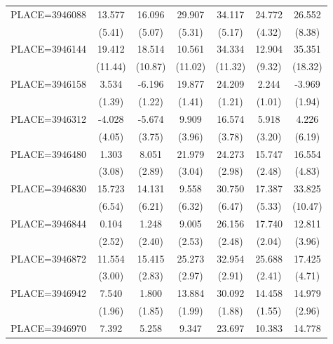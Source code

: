 {\begin{tabular}{l*{6}{c}}
PLACE=3946088       &      13.577&      16.096&      29.907&      34.117&      24.772&      26.552\\
                    &      (5.41)&      (5.07)&      (5.31)&      (5.17)&      (4.32)&      (8.38)\\
PLACE=3946144       &      19.412&      18.514&      10.561&      34.334&      12.904&      35.351\\
                    &     (11.44)&     (10.87)&     (11.02)&     (11.32)&      (9.32)&     (18.32)\\
PLACE=3946158       &       3.534&      -6.196&      19.877&      24.209&       2.244&      -3.969\\
                    &      (1.39)&      (1.22)&      (1.41)&      (1.21)&      (1.01)&      (1.94)\\
PLACE=3946312       &      -4.028&      -5.674&       9.909&      16.574&       5.918&       4.226\\
                    &      (4.05)&      (3.75)&      (3.96)&      (3.78)&      (3.20)&      (6.19)\\
PLACE=3946480       &       1.303&       8.051&      21.979&      24.273&      15.747&      16.554\\
                    &      (3.08)&      (2.89)&      (3.04)&      (2.98)&      (2.48)&      (4.83)\\
PLACE=3946830       &      15.723&      14.131&       9.558&      30.750&      17.387&      33.825\\
                    &      (6.54)&      (6.21)&      (6.32)&      (6.47)&      (5.33)&     (10.47)\\
PLACE=3946844       &       0.104&       1.248&       9.005&      26.156&      17.740&      12.811\\
                    &      (2.52)&      (2.40)&      (2.53)&      (2.48)&      (2.04)&      (3.96)\\
PLACE=3946872       &      11.554&      15.415&      25.273&      32.954&      25.688&      17.425\\
                    &      (3.00)&      (2.83)&      (2.97)&      (2.91)&      (2.41)&      (4.71)\\
PLACE=3946942       &       7.540&       1.800&      13.884&      30.092&      14.458&      14.979\\
                    &      (1.96)&      (1.85)&      (1.99)&      (1.88)&      (1.55)&      (2.96)\\
PLACE=3946970       &       7.392&       5.258&       9.347&      23.697&      10.383&      14.778\\

\end{tabular}}

